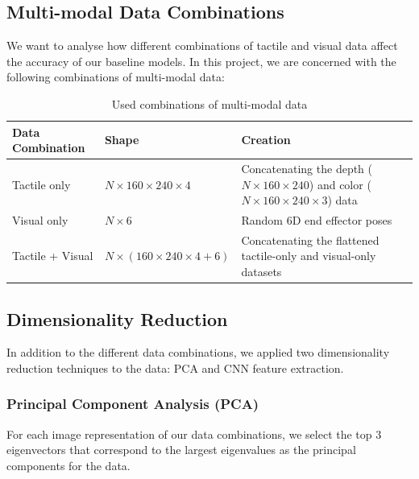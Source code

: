 \documentclass[11pt, a4paper]{report}
\theoremstyle{definition}
\begin{document}
\subsection{Multi-modal Data Combinations}
\label{sec:4.3.1}
We want to analyse how different combinations of tactile and visual data affect the accuracy of our baseline models. In this project, we are concerned with the following combinations of multi-modal data:
\begin{table}[H]
    \centering
    \begin{tabular}{|p{3cm}|p{4cm}|p{6cm}|}
        \hline
        Data Combination & Shape & Creation \\
        \hline
        Tactile only & $N\times160\times240\times4$ & Concatenating the depth ($N\times160\times240$) and color ($N\times160\times240\times3$) data \\
        \hline
        Visual only & $N\times6$ & Random 6D end effector poses \\
        \hline
        Tactile + Visual & $N\times(160\times240\times4+6)$ & Concatenating the flattened tactile-only and visual-only datasets \\
        \hline
    \end{tabular}
    \caption{Used combinations of multi-modal data}
    \label{tab:1}
\end{table}

\subsection{Dimensionality Reduction}
\label{sec:4.3.2}
In addition to the different data combinations, we applied two dimensionality reduction techniques to the data: PCA and CNN feature extraction.

\subsubsection{Principal Component Analysis (PCA)}
\label{sec:4.3.2.1}
For each image representation of our data combinations, we select the top 3 eigenvectors that correspond to the largest eigenvalues as the principal components for the data.
\end{document}
